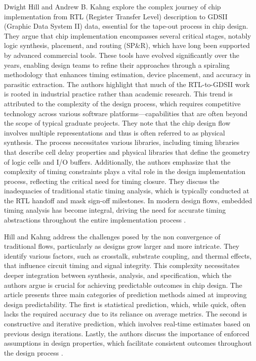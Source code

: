 Dwight Hill and Andrew B. Kahng explore the complex journey of chip implementation from RTL (Register Transfer Level) description to GDSII (Graphic Data System II) data, essential for the tape-out process in chip design. They argue that chip implementation encompasses several critical stages, notably logic synthesis, placement, and routing (SP\&R), which have long been supported by advanced commercial tools. These tools have evolved significantly over the years, enabling design teams to refine their approaches through a spiraling methodology that enhances timing estimation, device placement, and accuracy in parasitic extraction. The authors highlight that much of the RTL-to-GDSII work is rooted in industrial practice rather than academic research. This trend is attributed to the complexity of the design process, which requires competitive technology across various software platforms—capabilities that are often beyond the scope of typical graduate projects. They note that the chip design flow involves multiple representations and thus is often referred to as physical synthesis. The process necessitates various libraries, including timing libraries that describe cell delay properties and physical libraries that define the geometry of logic cells and I/O buffers. Additionally, the authors emphasize that the complexity of timing constraints plays a vital role in the design implementation process, reflecting the critical need for timing closure. They discuss the inadequacies of traditional static timing analysis, which is typically conducted at the RTL handoff and mask sign-off milestones. In modern design flows, embedded timing analysis has become integral, driving the need for accurate timing abstractions throughout the entire implementation process \cite{hill2004guest}.

Hill and Kahng address the challenges posed by the non convergence of traditional flows, particularly as designs grow larger and more intricate. They identify various factors, such as crosstalk, substrate coupling, and thermal effects, that influence circuit timing and signal integrity. This complexity necessitates deeper integration between synthesis, analysis, and specification, which the authors argue is crucial for achieving predictable outcomes in chip design. The article presents three main categories of prediction methods aimed at improving design predictability. The first is statistical prediction, which, while quick, often lacks the required accuracy due to its reliance on average metrics. The second is constructive and iterative prediction, which involves real-time estimates based on previous design iterations. Lastly, the authors discuss the importance of enforced assumptions in design properties, which facilitate consistent outcomes throughout the design process \cite{hill2004guest}.
